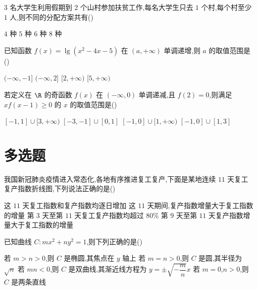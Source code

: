 \begin{problem}
\(3\) 名大学生利用假期到 \(2\) 个山村参加扶贫工作,每名大学生只去 \(1\) 个村,每个村至少 \(1\) 人,则不同的分配方案共有(\quad)

\choices
    {\(4\) 种}
    {\(5\) 种}
    {\(6\) 种}
    {\(8\) 种}
\end{problem}

\begin{problem}
已知函数 \(f(x)=\lg(x^2-4x-5)\) 在 \((a,+\infty)\) 单调递增,则 \(a\) 的取值范围是(\quad)

\choices
    {\((-\infty,-1]\)}
    {\((-\infty,2]\)}
    {\([2,+\infty)\)}
    {\([5,+\infty)\)}
\end{problem}

\begin{problem}
若定义在 \(\R\) 的奇函数 \(f(x)\) 在 \((-\infty,0)\) 单调递减,且 \(f(2)=0\),则满足 \(xf(x-1)\geqslant0\) 的 \(x\) 的取值范围是(\quad)

\choices
    {\([-1,1]\cup[3,+\infty)\)}
    {\([-3,-1]\cup[0,1]\)}
    {\([-1,0]\cup[1,+\infty)\)}
    {\([-1,0]\cup[1,3]\)}
\end{problem}

\section{多选题}

\begin{problem}
我国新冠肺炎疫情进入常态化,各地有序推进复工复产,下面是某地连续 \(11\) 天复工复产指数折线图,下列说法正确的是(\quad)

\begin{center}
\end{center}

\choices
    {这 \(11\) 天复工指数和复产指数均逐日增加}
    {这 \(11\) 天期间,复产指数增量大于复工指数的增量}
    {第 \(3\) 天至第 \(11\) 天复工复产指数均超过 \(80\%\)}
    {第 \(9\) 天至第 \(11\) 天复产指数增量大于复工指数的增量}
\end{problem}

\begin{problem}
已知曲线 \(C:mx^2+ny^2=1\),则下列正确的是(\quad)

\choices
    {若 \(m>n>0\),则 \(C\) 是椭圆,其焦点在 \(y\) 轴上}
    {若 \(m=n>0\),则 \(C\) 是圆,其半径为 \(\sqrt n\)}
    {若 \(mn<0\),则 \(C\) 是双曲线,其渐近线方程为 \(y=\pm\sqrt{-\dfrac{m}{n}}x\)}
    {若 \(m=0\),\(n>0\),则 \(C\) 是两条直线}
\end{problem}

